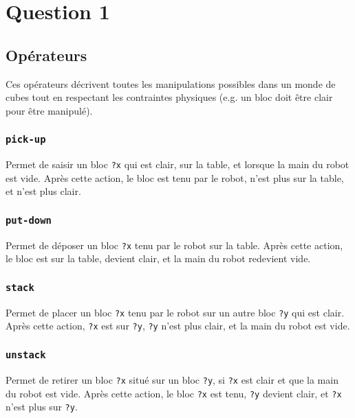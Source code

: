 \documentclass[../CSC_5RO16_TA_TP5.tex]{subfiles}
\begin{document}
\section{Question 1}
% 


\subsection{Opérateurs}
\noindent Ces opérateurs décrivent toutes les manipulations possibles dans un monde de cubes tout en respectant les contraintes physiques (e.g. un bloc doit être clair pour être manipulé).

\subsubsection{\texttt{pick-up}}
\begin{resolution}
    Permet de saisir un bloc \texttt{?x} qui est clair, sur la table, et lorsque la main du robot est vide. Après cette action, le bloc est tenu par le robot, n'est plus sur la table, et n'est plus clair.
\end{resolution}

\subsubsection{\texttt{put-down}}
\begin{resolution}
    Permet de déposer un bloc \texttt{?x} tenu par le robot sur la table. Après cette action, le bloc est sur la table, devient clair, et la main du robot redevient vide.
\end{resolution}

\subsubsection{\texttt{stack}}
\begin{resolution}
    Permet de placer un bloc \texttt{?x} tenu par le robot sur un autre bloc \texttt{?y} qui est clair. Après cette action, \texttt{?x} est sur \texttt{?y}, \texttt{?y} n'est plus clair, et la main du robot est vide.
\end{resolution}

\subsubsection{\texttt{unstack}}
\begin{resolution}
    Permet de retirer un bloc \texttt{?x} situé sur un bloc \texttt{?y}, si \texttt{?x} est clair et que la main du robot est vide. Après cette action, le bloc \texttt{?x} est tenu, \texttt{?y} devient clair, et \texttt{?x} n'est plus sur \texttt{?y}.
\end{resolution}
\end{document}
